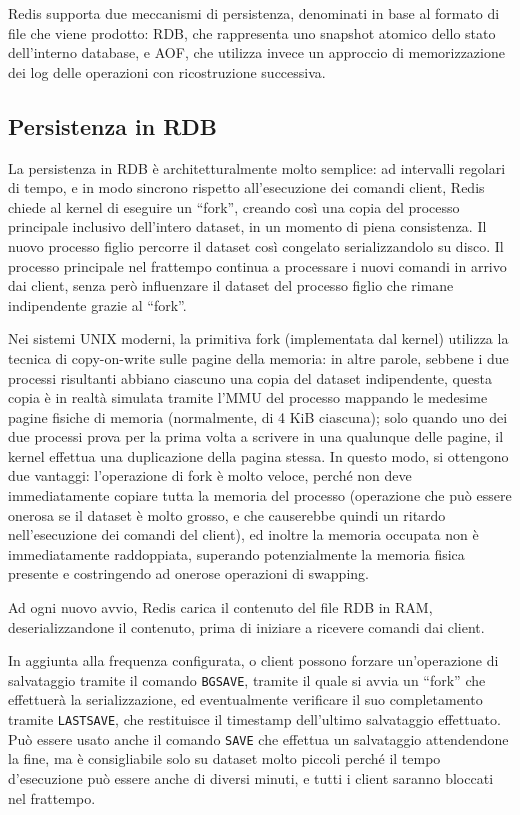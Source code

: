 Redis supporta due meccanismi di persistenza, denominati in base al formato di file che viene
prodotto: RDB, che rappresenta uno snapshot atomico dello stato dell'interno database, e AOF, che
utilizza invece un approccio di memorizzazione dei log delle operazioni con ricostruzione
successiva.

\subsection{Persistenza in RDB}

La persistenza in RDB è architetturalmente molto semplice: ad intervalli regolari di tempo, e in
modo sincrono rispetto all'esecuzione dei comandi client, Redis chiede al kernel di eseguire un
``fork'', creando così una copia del processo principale inclusivo dell'intero dataset, in un
momento di piena consistenza. Il nuovo processo figlio percorre il dataset così congelato
serializzandolo su disco. Il processo principale nel frattempo continua a processare i nuovi comandi
in arrivo dai client, senza però influenzare il dataset del processo figlio che rimane indipendente
grazie al ``fork''.

Nei sistemi UNIX moderni, la primitiva fork (implementata dal kernel) utilizza la tecnica di
copy-on-write sulle pagine della memoria: in altre parole, sebbene i due processi risultanti abbiano
ciascuno una copia del dataset indipendente, questa copia è in realtà simulata tramite l'MMU del
processo mappando le medesime pagine fisiche di memoria (normalmente, di 4 KiB ciascuna); solo
quando uno dei due processi prova per la prima volta a scrivere in una qualunque delle pagine, il
kernel effettua una duplicazione della pagina stessa. In questo modo, si ottengono due vantaggi:
l'operazione di fork è molto veloce, perché non deve immediatamente copiare tutta la memoria del
processo (operazione che può essere onerosa se il dataset è molto grosso, e che causerebbe quindi un
ritardo nell'esecuzione dei comandi del client), ed inoltre la memoria occupata non è immediatamente
raddoppiata, superando potenzialmente la memoria fisica presente e costringendo ad onerose
operazioni di swapping.

Ad ogni nuovo avvio, Redis carica il contenuto del file RDB in RAM, deserializzandone il contenuto,
prima di iniziare a ricevere comandi dai client.

In aggiunta alla frequenza configurata, o client possono forzare un'operazione di salvataggio 
tramite il comando \verb|BGSAVE|, tramite il quale si avvia un ``fork'' che effettuerà la
serializzazione, ed eventualmente verificare il suo completamento tramite \verb|LASTSAVE|, che
restituisce il timestamp dell'ultimo salvataggio effettuato. Può essere usato anche il comando
\verb|SAVE| che effettua un salvataggio attendendone la fine, ma è consigliabile solo su dataset
molto piccoli perché il tempo d'esecuzione può essere anche di diversi minuti, e tutti i client
saranno bloccati nel frattempo.



